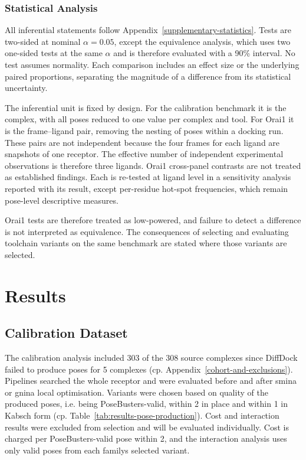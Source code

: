 \hypertarget{statistical-analysis}{%
\subsection{Statistical Analysis}\label{statistical-analysis}}

All inferential statements follow Appendix~\ref{supplementary-statistics}. Tests are two-sided at nominal \ensuremath{\alpha = 0.05}, except the equivalence analysis, which uses two one-sided tests at the same \ensuremath{\alpha} and is therefore evaluated with a 90\% interval. No test assumes normality. Each comparison includes an effect size or the underlying paired proportions, separating the magnitude of a difference from its statistical uncertainty.

The inferential unit is fixed by design. For the calibration benchmark it is the complex, with all poses reduced to one value per complex and tool. For Orai1 it is the frame--ligand pair, removing the nesting of poses within a docking run. These pairs are not independent because the four frames for each ligand are snapshots of one receptor. The effective number of independent experimental observations is therefore three ligands. Orai1 cross-panel contrasts are not treated as established findings. Each is re-tested at ligand level in a sensitivity analysis reported with its result, except per-residue hot-spot frequencies, which remain pose-level descriptive measures.

Orai1 tests are therefore treated as low-powered, and failure to detect a difference is not interpreted as equivalence. The consequences of selecting and evaluating toolchain variants on the same benchmark are stated where those variants are selected.

\hypertarget{results}{%
\chapter{Results}\label{results}}

\hypertarget{calibration-dataset-1}{%
\section{Calibration Dataset}\label{calibration-dataset-1}}

The calibration analysis included 303 of the 308 source complexes since DiffDock failed to produce poses for 5 complexes (cp. Appendix~\ref{cohort-and-exclusions}). Pipelines searched the whole receptor and were evaluated before and after smina or gnina local optimisation. Variants were chosen based on quality of the produced poses, i.e. being PoseBusters-valid, within 2\angstrom{} in place and within 1\angstrom{} in Kabsch form (cp. Table~\ref{tab:results-pose-production}). Cost and interaction results were excluded from selection and will be evaluated individually. Cost is charged per PoseBusters-valid pose within 2\angstrom{}, and the interaction analysis uses only valid poses from each family\textquotesingle s selected variant.

